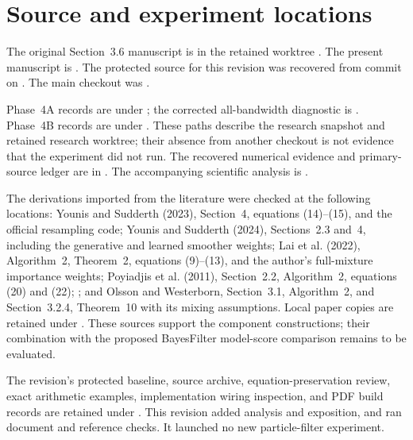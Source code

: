 \appendix
\section{Source and experiment locations}

The original Section~3.6 manuscript is
in the retained worktree
.
The present manuscript is
.
The protected source for this revision was recovered from commit
 on
. The main checkout was
.

Phase~4A records are under
; the
corrected all-bandwidth diagnostic is
.
Phase~4B records are under
.
These paths describe the research snapshot and retained research worktree;
their absence from another checkout is not evidence that the experiment did
not run. The recovered numerical evidence and primary-source ledger are in
.
The accompanying scientific analysis is
.

The derivations imported from the literature were checked at the following
locations: Younis and Sudderth (2023), Section~4, equations (14)--(15), and
the official resampling code; Younis and Sudderth (2024), Sections~2.3 and~4,
including the generative and learned smoother weights; Lai et al. (2022),
Algorithm~2, Theorem~2, equations (9)--(13), and the author's full-mixture
importance weights; Poyiadjis et al. (2011), Section~2.2, Algorithm~2,
equations (20) and (22); \citet[Section~4.2, equations (24)--(25)]{scibior2021dpf};
and Olsson and Westerborn, Section~3.1, Algorithm~2, and Section~3.2.4,
Theorem~10 with its mixing assumptions. Local paper copies are retained under
. These sources support the component
constructions; their combination with the proposed BayesFilter model-score
comparison remains to be evaluated.

The revision's protected baseline, source archive, equation-preservation
review, exact arithmetic examples, implementation wiring inspection, and
PDF build records are retained under
.
This revision added analysis and exposition, and ran document and reference
checks. It launched no new particle-filter experiment.
